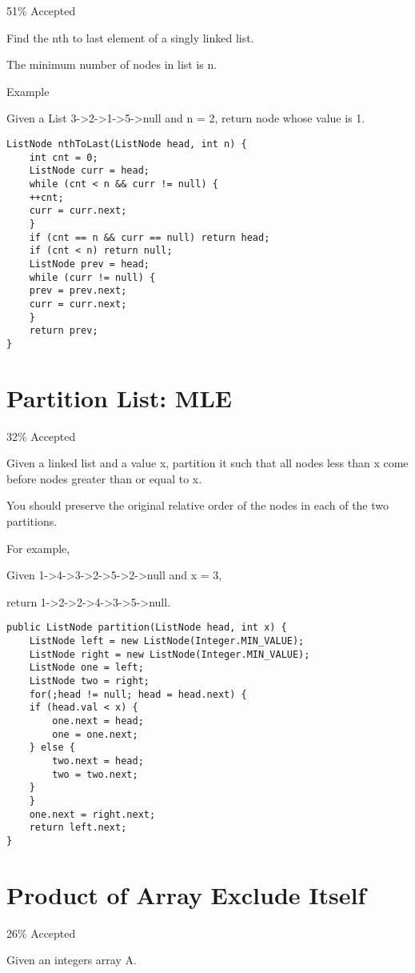 \documentclass[12pt]{book}
\begin{document}
51\% Accepted

Find the nth to last element of a singly linked list. 

The minimum number of nodes in list is n.

Example

Given a List  3->2->1->5->null and n = 2, return node  whose value is 1.
\lstset{language=java,label= ,caption= ,numbers=none}
\begin{lstlisting}
ListNode nthToLast(ListNode head, int n) {
    int cnt = 0;
    ListNode curr = head;
    while (cnt < n && curr != null) {
	++cnt;
	curr = curr.next;
    }
    if (cnt == n && curr == null) return head;
    if (cnt < n) return null;
    ListNode prev = head;
    while (curr != null) {
	prev = prev.next;
	curr = curr.next;
    }
    return prev;
}
\end{lstlisting}
\chapter{Partition List: MLE}
\label{sec-50}

32\% Accepted

Given a linked list and a value x, partition it such that all nodes less than x come before nodes greater than or equal to x.

You should preserve the original relative order of the nodes in each of the two partitions.

For example,

Given 1->4->3->2->5->2->null and x = 3,

return 1->2->2->4->3->5->null.
\lstset{language=java,label= ,caption= ,numbers=none}
\begin{lstlisting}
public ListNode partition(ListNode head, int x) {
    ListNode left = new ListNode(Integer.MIN_VALUE);
    ListNode right = new ListNode(Integer.MIN_VALUE);
    ListNode one = left;
    ListNode two = right;
    for(;head != null; head = head.next) {
	if (head.val < x) {
	    one.next = head;
	    one = one.next;
	} else {
	    two.next = head;
	    two = two.next;
	}
    }
    one.next = right.next;
    return left.next;
}
\end{lstlisting}
\chapter{Product of Array Exclude Itself}
\label{sec-51}

26\% Accepted

Given an integers array A.
\end{document}
